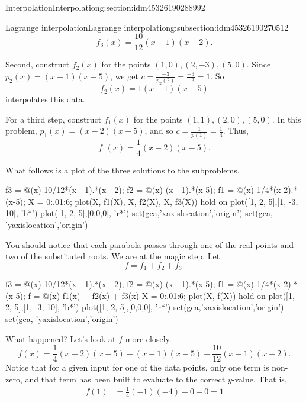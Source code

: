 \documentclass[oneside,10pt,]{article}
\numberwithin{equation}{section}
\numberwithin{equation}{section}
\newcommand{\amp}{&}
\begin{document}
\begin{sectionptx}{Interpolation}{}{Interpolation}{}{}{g:section:idm45326190288992}
\begin{subsectionptx}{Lagrange interpolation}{}{Lagrange interpolation}{}{}{g:subsection:idm45326190270512}
\begin{equation*}
f_3(x) = \frac{10}{12} (x-1)(x-2).
\end{equation*}
%
\par
Second, construct \(f_2(x)\) for the points \((1,0), (2, -3), (5,0).\) Since \(p_2(x) = (x-1)(x-5)\), we get \(c = \frac{-3}{p_2(2)} = \frac{-3}{-3} = 1\). So%
\begin{equation*}
f_2(x) = 1(x - 1)(x-5)
\end{equation*}
interpolates this data.%
\par
For a third step, construct \(f_1(x)\) for the points \((1,1), (2,0), (5,0)\). In this problem, \(p_1(x) = (x-2)(x-5)\), and so \(c = \frac{1}{p(1)} = \frac{1}{4}\). Thus,%
\begin{equation*}
f_1(x) = \frac{1}{4} (x - 2)(x -5).
\end{equation*}
%
\par
What follows is a plot of the three solutions to the subproblems.%
\begin{sageinput}
f3 = @(x) 10/12*(x - 1).*(x - 2);
f2 = @(x) (x - 1).*(x-5);
f1 = @(x) 1/4*(x-2).*(x-5);
X = 0:.01:6;
plot(X, f1(X), X, f2(X), X, f3(X))
hold on
plot([1, 2, 5],[1, -3, 10], 'b*')
plot([1, 2, 5],[0,0,0], 'r*')
set(gca,'xaxislocation','origin')
set(gca, 'yaxislocation','origin')
\end{sageinput}
You should notice that each parabola passes through one of the real points and two of the substituted roots. We are at the magic step. Let%
\begin{equation*}
f = f_1 + f_2 + f_3.
\end{equation*}
%
\begin{sageinput}
f3 = @(x) 10/12*(x - 1).*(x - 2);
f2 = @(x) (x - 1).*(x-5);
f1 = @(x) 1/4*(x-2).*(x-5);
f = @(x) f1(x) + f2(x) + f3(x)
X = 0:.01:6;
plot(X, f(X))
hold on
plot([1, 2, 5],[1, -3, 10], 'b*')
plot([1, 2, 5],[0,0,0], 'r*')
set(gca,'xaxislocation','origin')
set(gca, 'yaxislocation','origin')
\end{sageinput}
What happened? Let's look at \(f\) more closely.%
\begin{equation*}
f(x) = \frac{1}{4}(x - 2)(x - 5) + (x-1)(x-5) + \frac{10}{12}(x-1)(x-2).
\end{equation*}
Notice that for a given input for one of the data points, only one term is non-zero, and that term has been built to evaluate to the correct \(y\)-value. That is,%
\begin{align*}
f(1) \amp= \frac{1}{4}(-1)(-4) + 0 + 0 = 1\\

\end{align*}
\end{subsectionptx}
\end{sectionptx}
\end{document}
